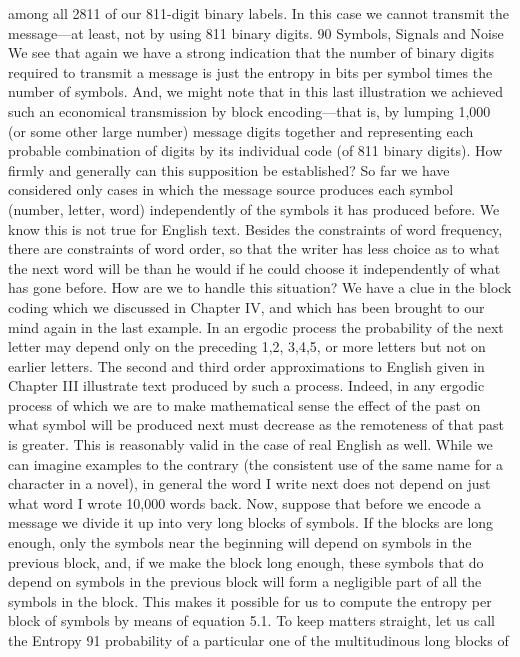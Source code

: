 among all 2811 of our 811-digit binary labels. In this case we cannot
transmit the message—at least, not by using 811 binary digits.
90
Symbols, Signals and Noise
We see that again we have a strong indication that the number
of binary digits required to transmit a message is just the entropy
in bits per symbol times the number of symbols. And, we might
note that in this last illustration we achieved such an economical
transmission by block encoding—that is, by lumping 1,000 (or some
other large number) message digits together and representing each
probable combination of digits by its individual code (of 811 binary
digits).
How firmly and generally can this supposition be established?
So far we have considered only cases in which the message
source produces each symbol (number, letter, word) independently
of the symbols it has produced before. We know this is not true
for English text. Besides the constraints of word frequency, there
are constraints of word order, so that the writer has less choice as
to what the next word will be than he would if he could choose it
independently of what has gone before.
How are we to handle this situation? We have a clue in the
block coding which we discussed in Chapter IV, and which has been
brought to our mind again in the last example. In an ergodic
process the probability of the next letter may depend only on the
preceding 1,2, 3,4,5, or more letters but not on earlier letters. The
second and third order approximations to English given in Chapter
III illustrate text produced by such a process. Indeed, in any
ergodic process of which we are to make mathematical sense the
effect of the past on what symbol will be produced next must
decrease as the remoteness of that past is greater. This is reasonably
valid in the case of real English as well. While we can imagine
examples to the contrary (the consistent use of the same name for
a character in a novel), in general the word I write next does not
depend on just what word I wrote 10,000 words back.
Now, suppose that before we encode a message we divide it up
into very long blocks of symbols. If the blocks are long enough,
only the symbols near the beginning will depend on symbols in the
previous block, and, if we make the block long enough, these
symbols that do depend on symbols in the previous block will
form a negligible part of all the symbols in the block. This makes
it possible for us to compute the entropy per block of symbols by
means of equation 5.1. To keep matters straight, let us call the
Entropy 91
probability of a particular one of the multitudinous long blocks of
